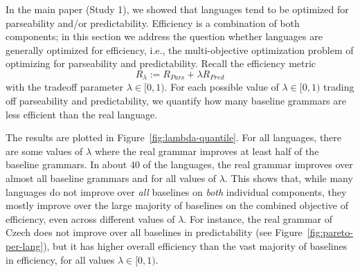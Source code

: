 \documentclass[10pt,twoside,lineno]{article}
\begin{document}


In the main paper (Study 1), we showed that languages tend to be optimized for parseability and/or predictability.
Efficiency is a combination of both components; in this section we address the question whether languages are generally optimized for efficiency, i.e., the multi-objective optimization problem of optimizing for parseability and predictability.
Recall the efficiency metric
\begin{equation}
	R_\lambda := R_{Pars} + \lambda R_{Pred}
\end{equation}
with the tradeoff parameter $\lambda \in [0,1)$.
For each possible value of $\lambda \in [0,1)$ trading off parseability and predictability, we quantify how many baseline grammars are less efficient than the real language.

The results are plotted in Figure~\ref{fig:lambda-quantile}.
For all languages, there are some values of $\lambda$ where the real grammar improves at least half of the baseline grammars.
In about 40 of the languages, the real grammar improves over almost all baseline grammars and for all values of $\lambda$.
This shows that, while many languages do not improve over \emph{all} baselines on \emph{both} individual components, they mostly improve over the large majority of baselines on the combined objective of efficiency, even across different values of $\lambda$.
For instance, the real grammar of Czech does not improve over all baselines in predictability (see Figure~\ref{fig:pareto-per-lang}), but it has higher overall efficiency than the vast majority of baselines in efficiency, for all values $\lambda \in [0,1)$.
\end{document}
